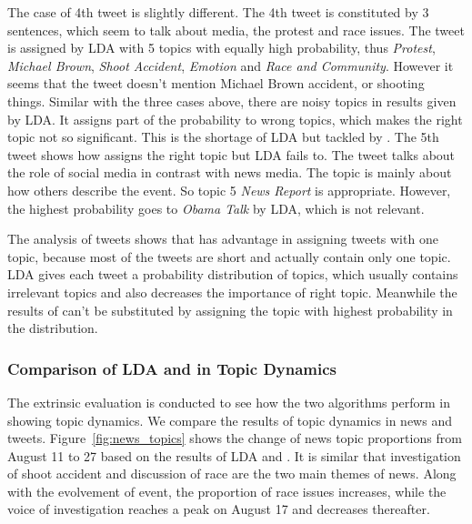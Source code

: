 The case of 4th tweet is slightly different. The 4th tweet is constituted by 3 sentences, which seem to talk about media, the protest and race issues. The tweet is assigned by LDA with 5 topics with equally high probability, thus \emph{Protest}, \emph{Michael Brown}, \emph{Shoot Accident}, \emph{Emotion} and \emph{Race and Community}. However it seems that the tweet doesn't mention Michael Brown accident, or shooting things. Similar with the three cases above, there are noisy topics in results given by LDA. It assigns part of the probability to wrong topics, which makes the right topic not so significant. This is the shortage of LDA but tackled by \stlda.
The 5th tweet shows how \stlda assigns the right topic but LDA fails to. The tweet talks about the role of social media in contrast with news media. The topic is mainly about how others describe the event. So topic 5 \emph{News Report} is appropriate. However, the highest probability goes to \emph{Obama Talk} by LDA, which is not relevant.

The analysis of tweets shows that \stlda has advantage in assigning tweets with one topic, because most of the tweets are short and actually contain only one topic. LDA gives each tweet a probability distribution of topics, which usually contains irrelevant topics and also decreases the importance of right topic. Meanwhile the results of \stlda can't be substituted by assigning the topic with highest probability in the distribution.

\subsubsection{Comparison of LDA and \stlda in Topic Dynamics}
\label{subsubsec:extrinsic}

The extrinsic evaluation is conducted to see how the two algorithms perform in showing topic dynamics. We compare the results of topic dynamics in news and tweets. Figure~\ref{fig:news_topics} shows the change of news topic proportions from August 11 to 27 based on the results of LDA and \stlda. It is similar that investigation of shoot accident and discussion of race are the two main themes of news. Along with the evolvement of event, the proportion of race issues increases, while the voice of investigation reaches a peak on August 17 and decreases thereafter.

